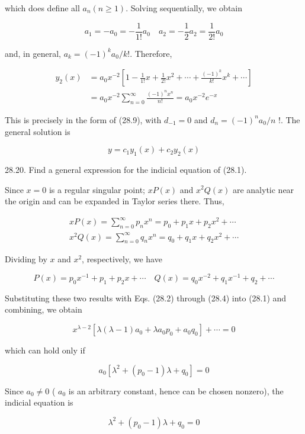\documentclass[10pt]{article}
\begin{document}
which does define all $a_{n}(n \geq 1)$. Solving sequentially, we obtain

$$
a_{1}=-a_{0}=-\frac{1}{1 !} a_{0} \quad a_{2}=-\frac{1}{2} a_{2}=\frac{1}{2 !} a_{0}
$$

and, in general, $a_{k}=(-1)^{k} a_{0} / k !$. Therefore,

$$
\begin{aligned}
y_{2}(x) & =a_{0} x^{-2}\left[1-\frac{1}{1 !} x+\frac{1}{2 !} x^{2}+\cdots+\frac{(-1)^{k}}{k !} x^{k}+\cdots\right] \\
& =a_{0} x^{-2} \sum_{n=0}^{\infty} \frac{(-1)^{n} x^{n}}{n !}=a_{0} x^{-2} e^{-x}
\end{aligned}
$$

This is precisely in the form of (28.9), with $d_{-1}=0$ and $d_{n}=(-1)^{n} a_{0} / n$ !. The general solution is

$$
y=c_{1} y_{1}(x)+c_{2} y_{2}(x)
$$

28.20. Find a general expression for the indicial equation of (28.1).

Since $x=0$ is a regular singular point; $x P(x)$ and $x^{2} Q(x)$ are analytic near the origin and can be expanded in Taylor series there. Thus,

$$
\begin{gathered}
x P(x)=\sum_{n=0}^{\infty} p_{n} x^{n}=p_{0}+p_{1} x+p_{2} x^{2}+\cdots \\
x^{2} Q(x)=\sum_{n=0}^{\infty} q_{n} x^{n}=q_{0}+q_{1} x+q_{2} x^{2}+\cdots
\end{gathered}
$$

Dividing by $x$ and $x^{2}$, respectively, we have

$$
P(x)=p_{0} x^{-1}+p_{1}+p_{2} x+\cdots \quad Q(x)=q_{0} x^{-2}+q_{1} x^{-1}+q_{2}+\cdots
$$

Substituting these two results with Eqs. (28.2) through (28.4) into (28.1) and combining, we obtain

$$
x^{\lambda-2}\left[\lambda(\lambda-1) a_{0}+\lambda a_{0} p_{0}+a_{0} q_{0}\right]+\cdots=0
$$

which can hold only if

$$
a_{0}\left[\lambda^{2}+\left(p_{0}-1\right) \lambda+q_{0}\right]=0
$$

Since $a_{0} \neq 0$ ( $a_{0}$ is an arbitrary constant, hence can be chosen nonzero), the indicial equation is


\begin{equation*}
\lambda^{2}+\left(p_{0}-1\right) \lambda+q_{0}=0 \tag{1}
\end{equation*}
\end{document}
